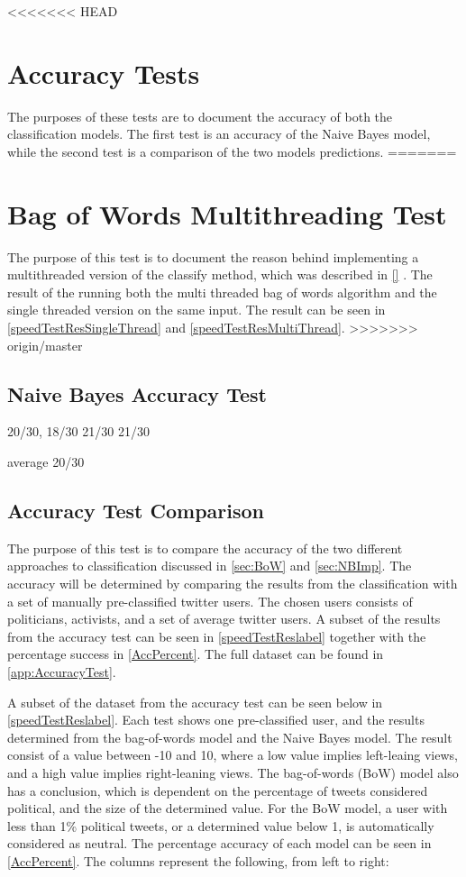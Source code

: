 <<<<<<< HEAD
\section{Accuracy Tests}
The purposes of these tests are to document the accuracy of both the
classification models. The first test is an accuracy of the Naive Bayes model,
while the second test is a comparison of the two models predictions.
=======
\section{Bag of Words Multithreading Test}\label{test:multithread}
The purpose of this test is to document the reason behind implementing a
multithreaded version of the classify method, which was described in \autoref{}
. 
The result of the running both the multi threaded bag of words algorithm and the
single threaded version on the same input.
The result can be seen in \autoref{speedTestResSingleThread} and
\autoref{speedTestResMultiThread}.
>>>>>>> origin/master

\subsection{Naive Bayes Accuracy Test}

20/30, 18/30 21/30 21/30

average 20/30

\subsection{Accuracy Test Comparison}
The purpose of this test is to compare the accuracy of the two different
approaches to classification discussed in \autoref{sec:BoW} and
\autoref{sec:NBImp}. The accuracy will be determined by comparing the results
from the classification with a set of manually pre-classified twitter users.
The chosen users consists of politicians, activists, and a set of average
twitter users. A subset of the results from the accuracy test can be seen in
\autoref{speedTestReslabel} together with the percentage success in
\autoref{AccPercent}. The full dataset can be found in
\autoref{app:AccuracyTest}.\nl

A subset of the dataset from the accuracy test can be seen below in
\autoref{speedTestReslabel}. Each test shows one pre-classified user, and the
results determined from the bag-of-words model and the Naive Bayes model. The
result consist of a value between -10 and 10, where a low value implies
left-leaing views, and a high value implies right-leaning views. The
bag-of-words (BoW) model also has a conclusion, which is dependent on the
percentage of tweets considered political, and the size of the determined value.
For the BoW model, a user with less than 1\% political tweets, or a determined
value below 1, is automatically considered as neutral. The percentage accuracy
of each model can be seen in \autoref{AccPercent}.
The columns represent the following, from left to right:\nl

